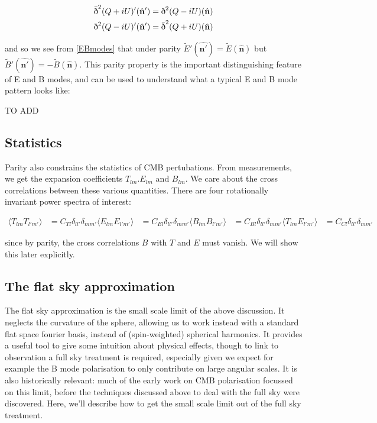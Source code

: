 \documentclass[a4paper,11pt]{article}
\renewcommand{\v}[1]{\mathbf{#1}}
\newcommand{\unit}[1]{\hat{\v{#1}}}
\newcommand{\sr}{\text{\normalfont\dh}}
\renewcommand{\sl}{\bar{\text{\normalfont\dh}}}
\begin{document}
\begin{align}
\sl^2(Q+iU)'(\unit{n}') = \sr^2 (Q-iU)(\unit{n})\\
\sr^2(Q-iU)'(\unit{n}') = \sl^2 (Q+iU)(\unit{n})
\end{align}

and so we see from \ref{EBmodes} that under parity $\tilde{E}'(\unit{n'})=\tilde{E}(\unit{n})$ but $\tilde{B}'(\unit{n'})=-\tilde{B}(\unit{n})$. This parity property is the important distinguishing feature of E and B modes, and can be used to understand what a typical E and B mode pattern looks like:

TO ADD

\subsection{Statistics}
Parity also constrains the statistics of CMB pertubations. From measurements, we get the expansion coefficients $T_{lm}. E_{lm}$ and $B_{lm}$. We care about the cross correlations between these various quantities. There are four rotationally invariant power spectra of interest:

\begin{align}
\langle T_{lm}T_{l'm'} \rangle &= C_{Tl}\delta_{ll'}\delta_{mm'}
\langle E_{lm}E_{l'm'} \rangle &= C_{El}\delta_{ll'}\delta_{mm'}
\langle B_{lm}B_{l'm'} \rangle &= C_{Bl}\delta_{ll'}\delta_{mm'}
\langle T_{lm}E_{l'm'} \rangle &= C_{Cl}\delta_{ll'}\delta_{mm'}
\end{align}

since by parity, the cross correlations $B$ with $T$ and $E$ must vanish. We will show this later explicitly. 





\subsection{The flat sky approximation}

The flat sky approximation is the small scale limit of the above discussion. It neglects the curvature of the sphere, allowing us to work instead with a standard flat space fourier basis, instead of (spin-weighted) spherical harmonics. It provides a useful tool to give some intuition about physical effects, though to link to observation a full sky treatment is required, especially given we expect for example the B mode polarisation to only contribute on large angular scales. It is also historically relevant: much of the early work on CMB polarisation focussed on this limit, before the techniques discussed above to deal with the full sky were discovered. Here, we'll describe how to get the small scale limit out of the full sky treatment.
\end{document}
